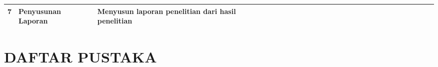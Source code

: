 \documentclass[oneside,listof=totoc]{scrbook}
\begin{document}
\begin{table}
\begin{minipage}{\textwidth}
\begin{longtable}{|l|p{3.0cm}|p{4.5cm}|l|l|l|l|l|l|l|l|l|l|l|l|l|l|l|l|l|l|l|l|l|l|l|l|}
  7 & Penyusunan Laporan & Menyusun laporan penelitian dari hasil penelitian & \cellcolor[HTML]{5B9BD5} & \cellcolor[HTML]{5B9BD5} & \cellcolor[HTML]{5B9BD5} & \cellcolor[HTML]{5B9BD5} & \cellcolor[HTML]{5B9BD5} & \cellcolor[HTML]{5B9BD5} & \cellcolor[HTML]{5B9BD5} & \cellcolor[HTML]{5B9BD5} & \cellcolor[HTML]{5B9BD5} & \cellcolor[HTML]{5B9BD5} & \cellcolor[HTML]{5B9BD5} & \cellcolor[HTML]{5B9BD5} & \cellcolor[HTML]{5B9BD5} & \cellcolor[HTML]{5B9BD5} & \cellcolor[HTML]{5B9BD5} & \cellcolor[HTML]{5B9BD5} & \cellcolor[HTML]{5B9BD5} & \cellcolor[HTML]{5B9BD5} & \cellcolor[HTML]{5B9BD5} & \cellcolor[HTML]{00FFFF} & \cellcolor[HTML]{00FFFF} & \cellcolor[HTML]{00FFFF} & \cellcolor[HTML]{00FFFF} & \cellcolor[HTML]{00FFFF} \\ \hline
  \end{longtable}
\end{minipage}
\end{table}


\backmatter
\pagestyle{plain}

\chapter{DAFTAR PUSTAKA}

\vspace{0.5cm}
\end{document}
